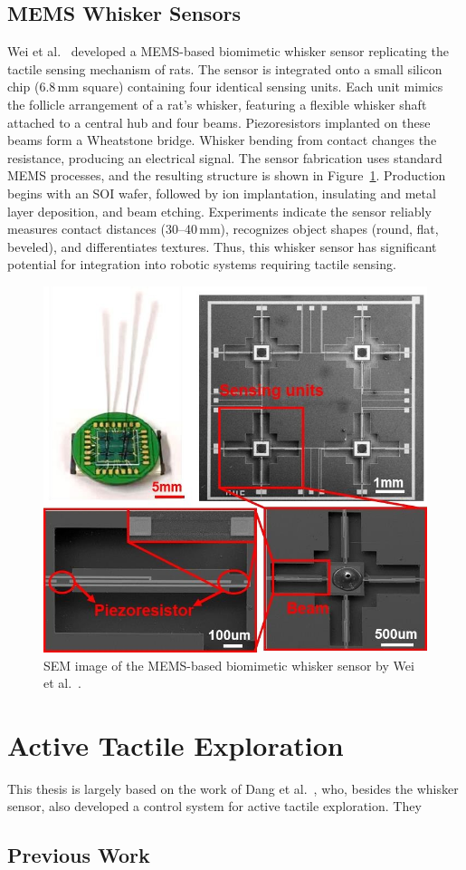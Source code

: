 \subsection{MEMS Whisker Sensors}
Wei et al.~\cite{9114501} developed a MEMS-based biomimetic whisker sensor replicating the tactile sensing mechanism of rats.
The sensor is integrated onto a small silicon chip (6.8\,mm square) containing four identical sensing units.
Each unit mimics the follicle arrangement of a rat's whisker, featuring a flexible whisker shaft attached to a central hub and four beams.
Piezoresistors implanted on these beams form a Wheatstone bridge.
Whisker bending from contact changes the resistance, producing an electrical signal.
The sensor fabrication uses standard MEMS processes, and the resulting structure is shown in Figure~\ref{fig:mems-whisker}.
Production begins with an SOI wafer, followed by ion implantation, insulating and metal layer deposition, and beam etching.
Experiments indicate the sensor reliably measures contact distances (30--40\,mm), recognizes object shapes (round, flat, beveled), and differentiates textures.
Thus, this whisker sensor has significant potential for integration into robotic systems requiring tactile sensing.

\begin{figure}[htb]
    \centering
    \includegraphics[height=0.4\textheight]{figures/mems-whisker}
    \caption{SEM image of the MEMS-based biomimetic whisker sensor by Wei et al.~\cite{9114501}.}
    \label{fig:mems-whisker}
\end{figure}


\section{Active Tactile Exploration}

This thesis is largely based on the work of Dang et al.~\cite{dang2025whisker}, who, besides the whisker sensor, also developed a control system for active tactile exploration.
They
\subsection{Previous Work}

